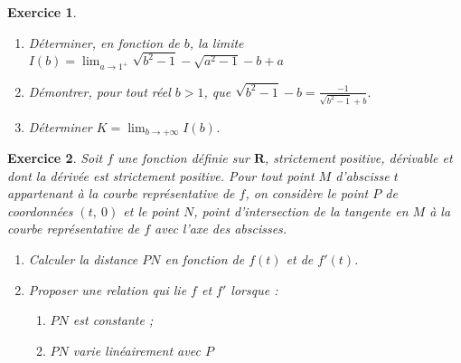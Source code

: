 \documentclass[12pt,a4paper,french]{article}
\newcommand{\R}{\mathbf{R}}
\theoremstyle{break}
\newtheorem{exercice}{Exercice}
\theoremstyle{nonumberplain}
\theoremstyle{nonumberbreak}
\begin{document}
\begin{exercice}
\begin{enumerate}[resume]
      \begin{enumerate}
        \item Déterminer, en fonction de $b$, la limite $I(b) =
          \lim_{a\to1^+}\sqrt{b^2 - 1} - \sqrt{a^2 - 1} - b + a$
        \item Démontrer, pour tout réel $b > 1$, que $\sqrt{b^2 - 1} - b
          = \frac{-1}{\sqrt{b^2 - 1} + b}.$
        \item Déterminer $K = \lim_{b\to+\infty} I(b)$.
      \end{enumerate}
  \end{enumerate}
\end{exercice}

\begin{exercice}
  Soit $f$ une fonction définie sur $\R$, strictement positive,
  dérivable et dont la dérivée est strictement positive. Pour tout point
  $M$ d'abscisse $t$ appartenant à la courbe représentative de $f$, on
  considère le point $P$ de coordonnées $(t,~ 0)$ et le point $N$, point
  d'intersection de la tangente en $M$ à la courbe représentative de $f$
  avec l'axe des abscisses.
  \begin{enumerate}
    \item Calculer la distance $PN$ en fonction de $f(t)$ et de $f'(t)$.
    \item Proposer une relation qui lie $f$ et $f'$ lorsque :
      \begin{enumerate}
        \item $PN$ est constante ;
        \item $PN$ varie linéairement avec $P$
      \end{enumerate}
  \end{enumerate}
\end{exercice}

\pagebreak
\end{document}
